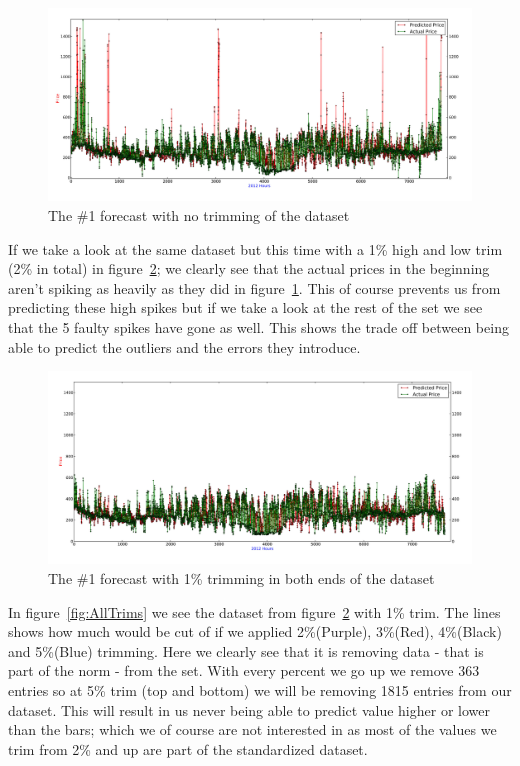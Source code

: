 \begin{figure}[H]
\centering
\includegraphics[width=0.85\linewidth,natwidth=898,natheight=587]{billeder/PriceExperimentalAnalysis/NoTrimming.jpg}
\caption{The \#1 forecast with no trimming of the dataset}
\label{fig:NoTrim}
\end{figure}

If we take a look at the same dataset but this time with a 1\% high and low trim (2\% in total) in figure~\ref{fig:1PTrim}; we clearly see that the actual prices in the beginning aren't spiking as heavily as they did in figure~\ref{fig:NoTrim}. This of course prevents us from predicting these high spikes but if we take a look at the rest of the set we see that the 5 faulty spikes have gone as well. This shows the trade off between being able to predict the outliers and the errors they introduce.

\begin{figure}[H]
\centering
\includegraphics[width=0.85\linewidth,natwidth=898,natheight=587]{billeder/PriceExperimentalAnalysis/1PTrim.jpg}
\caption{The \#1 forecast with 1\% trimming in both ends of the dataset}
\label{fig:1PTrim}
\end{figure}

In figure~\ref{fig:AllTrims} we see the dataset from figure~\ref{fig:1PTrim} with 1\% trim. The lines shows how much would be cut of if we applied 2\%(Purple), 3\%(Red), 4\%(Black) and 5\%(Blue) trimming. Here we clearly see that it is removing data - that is part of the norm - from the set. With every percent we go up we remove 363 entries so at 5\% trim (top and bottom) we will be removing 1815 entries from our dataset. This will result in us never being able to predict value higher or lower than the bars; which we of course are not interested in as most of the values we trim from 2\% and up are part of the standardized dataset.

